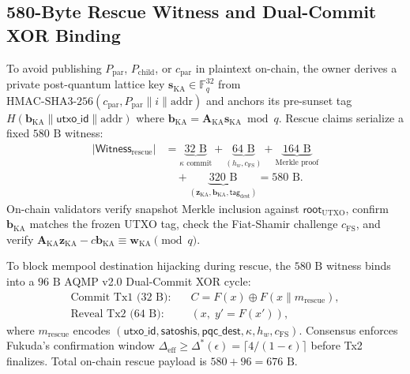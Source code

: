 \documentclass[conference,compsoc]{IEEEtran}
\begin{document}
\subsection{580-Byte Rescue Witness and Dual-Commit XOR Binding}
To avoid publishing $P_{\text{par}}$, $P_{\text{child}}$, or $c_{\text{par}}$ in plaintext on-chain, the owner derives a private post-quantum lattice key $\mathbf{s}_{\text{KA}} \in \mathbb{F}_q^{32}$ from $\mathrm{HMAC\text{-}SHA3\text{-}256}(c_{\text{par}}, P_{\text{par}} \parallel i \parallel \mathrm{addr})$ and anchors its pre-sunset tag $H(\mathbf{b}_{\text{KA}} \parallel \mathsf{utxo\_id} \parallel \mathrm{addr})$ where $\mathbf{b}_{\text{KA}} = \mathbf{A}_{\text{KA}}\mathbf{s}_{\text{KA}} \bmod q$. Rescue claims serialize a fixed $580\text{ B}$ witness:
\begin{equation}
\begin{aligned}
|\mathsf{Witness}_{\text{rescue}}|
  &= \underbrace{32\text{ B}}_{\kappa \text{ commit}}
   + \underbrace{64\text{ B}}_{(h_w, c_{\text{FS}})}
   + \underbrace{164\text{ B}}_{\text{Merkle proof}} \\
  &\quad + \underbrace{320\text{ B}}_{(\mathbf{z}_{\text{KA}}, \mathbf{b}_{\text{KA}}, \mathsf{tag}_{\text{dest}})}
   = 580\text{ B}.
\end{aligned}
\end{equation}
On-chain validators verify snapshot Merkle inclusion against $\mathsf{root}_{\text{UTXO}}$, confirm $\mathbf{b}_{\text{KA}}$ matches the frozen UTXO tag, check the Fiat-Shamir challenge $c_{\text{FS}}$, and verify $\mathbf{A}_{\text{KA}}\mathbf{z}_{\text{KA}} - c\mathbf{b}_{\text{KA}} \equiv \mathbf{w}_{\text{KA}} \pmod q$.

To block mempool destination hijacking during rescue, the $580\text{ B}$ witness binds into a $96\text{ B}$ AQMP v2.0 Dual-Commit XOR cycle:
\begin{equation}
\begin{aligned}
\text{Commit Tx1 (32 B):}\quad & C = F(x) \oplus F(x \parallel m_{\text{rescue}}), \\
\text{Reveal Tx2 (64 B):}\quad & (x,\; y' = F(x')),
\end{aligned}
\end{equation}
where $m_{\text{rescue}}$ encodes $(\mathsf{utxo\_id}, \mathsf{satoshis}, \mathsf{pqc\_dest}, \kappa, h_w, c_{\text{FS}})$. Consensus enforces Fukuda's confirmation window $\Delta_{\text{eff}} \ge \Delta^*(\epsilon) = \lceil 4/(1-\epsilon)\rceil$ before Tx2 finalizes. Total on-chain rescue payload is $580 + 96 = 676\text{ B}$.
\end{document}
